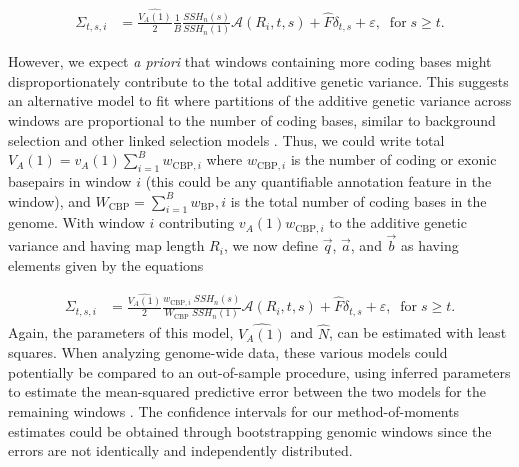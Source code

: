 \documentclass[11pt]{article}
\begin{document}
\begin{align}
  \Sigma_{t,s,i} &= \frac{\widehat{V_A(1)}}{2} \frac{1}{B} \frac{SSH_n(s)}{SSH_n(1)} \mathcal{A} (R_i, t,s ) +
            \widehat{F} \delta_{t,s}+ \varepsilon, \;\;  \text{for} \; s \geq t.
            \label{eq:mom-windows}
\end{align}

However, we expect \emph{a priori} that windows containing more coding bases
might disproportionately contribute to the total additive genetic variance.
This suggests an alternative model to fit where partitions of the additive
genetic variance across windows are proportional to the number of coding bases,
similar to background selection and other linked selection models
\parencite{Rockman2010-bw,McVicker2009-ax,Corbett-Detig2015-gt}. Thus, we could
write total $V_A(1) = v_A(1) \sum_{i=1}^B w_{\text{CBP},i}$ where
$w_{\text{CBP},i}$ is the number of coding or exonic basepairs in window $i$
(this could be any quantifiable annotation feature in the window), and
$W_\text{CBP} = \sum_{i=1}^B w_{\textrm{BP}},i$ is the total number of coding
bases in the genome. With window $i$ contributing $v_A(1) w_{\text{CBP}, i}$ to the
additive genetic variance and having map length $R_i$, we now define $\vec{q}$,
$\vec{a}$, and $\vec{b}$ as having elements given by the equations

\begin{align} 
  \Sigma_{t,s,i} &= \frac{\widehat{V_A(1)}}{2} \frac{w_{\text{CBP},i} \; SSH_n(s)}{W_{\text{CBP}} \; SSH_n(1)} \mathcal{A} (R_i, t, s) + \widehat{F} \delta_{t,s} + \varepsilon, \;\; \text{for} \; s \ge t.
  \label{eq:mom-windows-cbp}
\end{align}
%
Again, the parameters of this model, $\widehat{V_A(1)}$ and $\widehat{N}$, can
be estimated with least squares. When analyzing genome-wide data, these various
models could potentially be compared to an out-of-sample procedure, using
inferred parameters to estimate the mean-squared predictive error between the
two models for the remaining windows \parencite{Elyashiv2016-vt}. The
confidence intervals for our method-of-moments estimates could be obtained
through bootstrapping genomic windows since the errors are not identically and
independently distributed.

\end{document}
